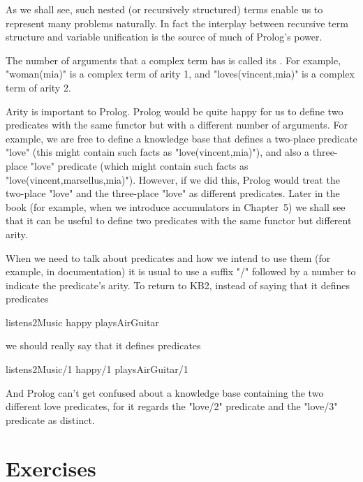 As we shall see, such nested (or recursively structured) terms enable
us to represent many problems naturally.  In fact the interplay
between recursive term structure and variable unification is the source
of much of Prolog's power.


The number of arguments that a complex term has is called its
.  For example, "woman(mia)" is a complex term of
arity 1, and "loves(vincent,mia)" is a complex term of arity 2.


Arity is important to Prolog.  Prolog would be quite happy for us to
define two predicates with the same functor but with a different
number of arguments.  For example, we are free to define a knowledge
base that defines a two-place predicate "love" (this might contain
such facts as "love(vincent,mia)"), and also a three-place "love"
predicate (which might contain such facts as
"love(vincent,marsellus,mia)"). However, if we did this, Prolog would
treat the two-place "love" and the three-place "love" as different
predicates. Later in the book (for example, when we introduce
accumulators in Chapter~5) we shall see that it can be useful to
define two predicates with the same functor but different arity.

When we need to talk about predicates and how we intend to use them
(for example, in documentation) it is usual to use a suffix "/"
followed by a number to indicate the predicate's arity.  To return to
KB2, instead of saying that it defines predicates
%
\begin{LPNcodedisplay}
listens2Music
happy
playsAirGuitar
\end{LPNcodedisplay}
%
we should really say that it defines predicates
%
\begin{LPNcodedisplay}
listens2Music/1
happy/1
playsAirGuitar/1
\end{LPNcodedisplay}
And Prolog can't get confused about a knowledge base containing the
two different love predicates, for it regards the "love/2" predicate
and the "love/3" predicate as distinct.



\section{Exercises}\label{SEC.L1.EXERCISES}

